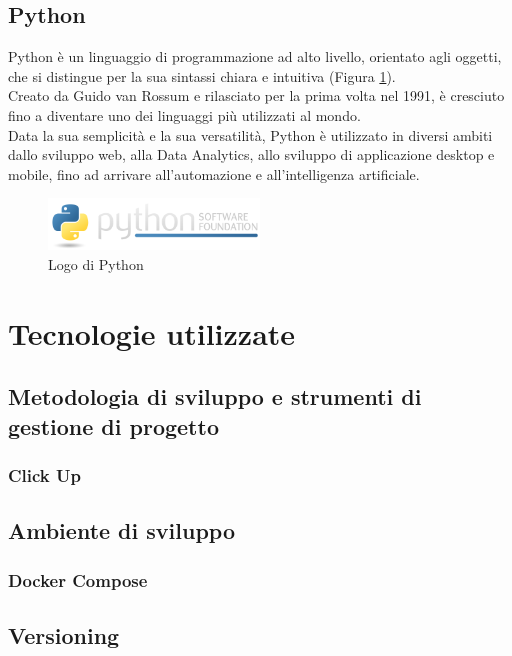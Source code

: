 \subsection{Python}
Python è un linguaggio di programmazione ad alto livello, orientato agli oggetti,
che si distingue per la sua sintassi chiara e intuitiva (Figura \ref{fig:python}).\\
Creato da Guido van Rossum e rilasciato per la prima volta nel 1991, è cresciuto fino a 
diventare uno dei linguaggi più utilizzati al mondo.\\
Data la sua semplicità e la sua versatilità, Python è utilizzato in diversi ambiti dallo sviluppo web, alla \gls{Data Analytics}{}, allo sviluppo di applicazione 
desktop e mobile, fino ad arrivare all'automazione e all'intelligenza artificiale.\\
\begin{figure}[hpp]
    \centering
    \includegraphics[width=0.5\textwidth]{images/tecnologie/logo_python.png}
    \caption{Logo di Python}
    \label{fig:python}
\end{figure}
\section{Tecnologie utilizzate}

\subsection{Metodologia di sviluppo e strumenti di gestione di progetto}

\subsubsection{Click Up}   %


\subsection{Ambiente di sviluppo}
\subsubsection{Docker Compose}
\pagebreak
\subsection{Versioning}
